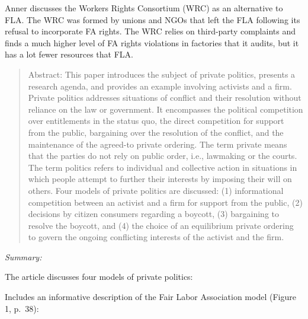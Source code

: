 \documentclass[
  12pt,
]{article}
\begin{document}
Anner discusses the Workers Rights Consortium (WRC) as an alternative to
FLA. The WRC was formed by unions and NGOs that left the FLA following
its refusal to incorporate FA rights. The WRC relies on third-party
complaints and finds a much higher level of FA rights violations in
factories that it audits, but it has a lot fewer resources that FLA.

\bigbreak


\begin{quote}
Abstract: 
This paper introduces the subject of private politics, presents a research agenda, and provides an example involving activists and a firm. Private politics addresses situations of conflict and their resolution without reliance on the law or government. It encompasses the political competition over entitlements in the status quo, the direct competition for support from the public, bargaining over the resolution of the conflict, and the maintenance of the agreed-to private ordering. The term private means that the parties do not rely on public order, i.e., lawmaking or the courts. The term politics refers to individual and collective action in situations in which people attempt to further their interests by imposing their will on others. Four models of private politics are discussed: (1) informational competition between an activist and a firm for support from the public, (2) decisions by citizen consumers regarding a boycott, (3) bargaining to resolve the boycott, and (4) the choice of an equilibrium private ordering to govern the ongoing conflicting interests of the activist and the firm.
\end{quote}

\emph{Summary:}

The article discusses four models of private politics:

Includes an informative description of the Fair Labor Association model
(Figure 1, p.~38):
\end{document}

